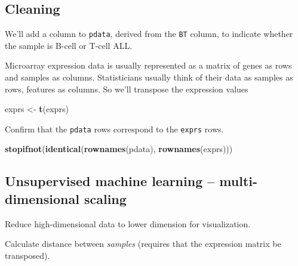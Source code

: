 \documentclass[]{article}
\newenvironment{Shaded}{\begin{snugshade}}{\end{snugshade}}
\newcommand{\KeywordTok}[1]{\textcolor[rgb]{0.13,0.29,0.53}{\textbf{#1}}}
\newcommand{\DecValTok}[1]{\textcolor[rgb]{0.00,0.00,0.81}{#1}}
\newcommand{\StringTok}[1]{\textcolor[rgb]{0.31,0.60,0.02}{#1}}
\newcommand{\OperatorTok}[1]{\textcolor[rgb]{0.81,0.36,0.00}{\textbf{#1}}}
\newcommand{\NormalTok}[1]{#1}
\theoremstyle{definition}
\theoremstyle{definition}
\theoremstyle{remark}
\begin{document}
\subsection{Cleaning}\label{cleaning}

We'll add a column to \texttt{pdata}, derived from the \texttt{BT}
column, to indicate whether the sample is B-cell or T-cell ALL.

\begin{Shaded}
\end{Shaded}

Microarray expression data is usually represented as a matrix of genes
as rows and samples as columns. Statisticians usually think of their
data as samples as rows, features as columns. So we'll transpose the
expression values

\begin{Shaded}
\begin{Highlighting}[]
\NormalTok{exprs <-}\StringTok{ }\KeywordTok{t}\NormalTok{(exprs)}
\end{Highlighting}
\end{Shaded}

Confirm that the \texttt{pdata} rows correspond to the \texttt{exprs}
rows.

\begin{Shaded}
\begin{Highlighting}[]
\KeywordTok{stopifnot}\NormalTok{(}\KeywordTok{identical}\NormalTok{(}\KeywordTok{rownames}\NormalTok{(pdata), }\KeywordTok{rownames}\NormalTok{(exprs)))}
\end{Highlighting}
\end{Shaded}

\subsection{Unsupervised machine learning -- multi-dimensional
scaling}\label{unsupervised-machine-learning-multi-dimensional-scaling}

Reduce high-dimensional data to lower dimension for visualization.

Calculate distance between \emph{samples} (requires that the expression
matrix be transposed).
\end{document}
